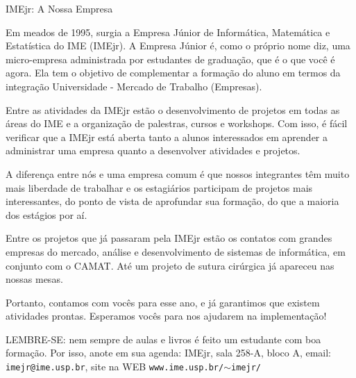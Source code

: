 \begin{secao}{IMEjr: A Nossa Empresa}

Em meados de 1995, surgia a Empresa Júnior de Informática, Matemática
e Estatística do IME (IMEjr). A Empresa Júnior é, como o próprio nome
diz, uma micro-empresa administrada por estudantes de graduação, que é
o que você é agora. Ela tem o objetivo de complementar a formação do
aluno em termos da integração Universidade - Mercado de Trabalho
(Empresas).

Entre as atividades da IMEjr estão o desenvolvimento de
projetos em todas as áreas do IME e a organização de palestras, cursos
e workshops. Com isso, é fácil verificar que a IMEjr está aberta tanto
a alunos interessados em aprender a administrar uma empresa quanto a
desenvolver atividades e projetos.

A diferença entre nós e uma
empresa comum é que nossos integrantes têm muito mais liberdade de
trabalhar e os estagiários participam de projetos mais interessantes,
do ponto de vista de aprofundar sua formação, do que a maioria dos
estágios por aí.

Entre os projetos que já passaram pela IMEjr estão
os contatos com grandes empresas do mercado, análise e desenvolvimento
de sistemas de informática,  em conjunto com o CAMAT. Até um projeto
de sutura cirúrgica já apareceu nas nossas mesas.

Portanto, contamos
com vocês para esse ano, e já garantimos que existem atividades
prontas. Esperamos vocês para nos ajudarem na implementação!

LEMBRE-SE: nem sempre de aulas e livros é feito um estudante com boa
formação. Por isso, anote em sua agenda: IMEjr, sala 258-A, bloco A,
email: {\tt imejr@ime.usp.br}, site na WEB
{\tt www.ime.usp.br/$\sim$imejr/}

\end{secao}
